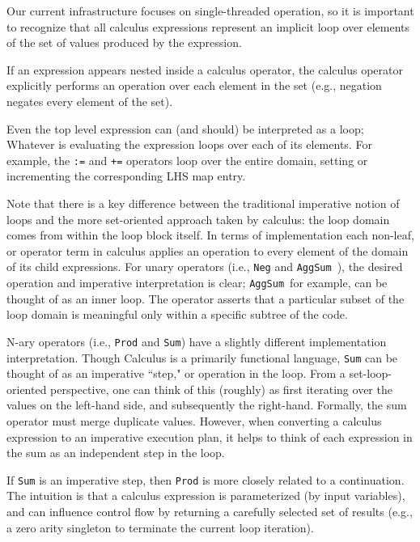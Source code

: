 \documentclass[11pt]{amsart}
\newcommand{\parsection}[1]{\smallskip\noindent{\bf #1.}}
\newcommand{\AggSum}{{\tt AggSum}\ }
\begin{document}
\parsection{Loops} 
Our current infrastructure focuses on single-threaded operation, so it is important to recognize that all calculus expressions represent an implicit loop over elements of the set of values produced by the expression.

If an expression appears nested inside a calculus operator, the calculus operator explicitly performs an operation over each element in the set (e.g., negation negates every element of the set).  

Even the top level expression can (and should) be interpreted as a loop; Whatever is evaluating the expression loops over each of its elements.  For example, the {\tt :=} and {\tt +=} operators loop over the entire domain, setting or incrementing the corresponding LHS map entry.

Note that there is a key difference between the traditional imperative notion of loops and the more set-oriented approach taken by calculus: the loop domain comes from within the loop block itself.  In terms of implementation each non-leaf, or operator term in calculus applies an operation to every element of the domain of its child expressions.  For unary operators (i.e., {\tt Neg} and \AggSum), the desired operation and imperative interpretation is clear; \AggSum for example, can be thought of as an inner loop.  The operator asserts that a particular subset of the loop domain is meaningful only within a specific subtree of the code.

N-ary operators (i.e., {\tt Prod} and {\tt Sum}) have a slightly different implementation interpretation.  Though Calculus is a primarily functional language, {\tt Sum} can be thought of as an imperative ``step," or operation in the loop.  From a set-loop-oriented perspective, one can think of this (roughly) as first iterating over the values on the left-hand side, and subsequently the right-hand.  Formally, the sum operator must merge duplicate values.  However, when converting a calculus expression to an imperative execution plan, it helps to think of each expression in the sum as an independent step in the loop.

\parsection{{\tt Prod} (and Singletons and Single-entry tables)}
If {\tt Sum} is an imperative step, then {\tt Prod} is more closely related to a continuation.  The intuition is that a calculus expression is parameterized (by input variables), and can influence control flow by returning a carefully selected set of results (e.g., a zero arity singleton to terminate the current loop iteration).  
\end{document}
